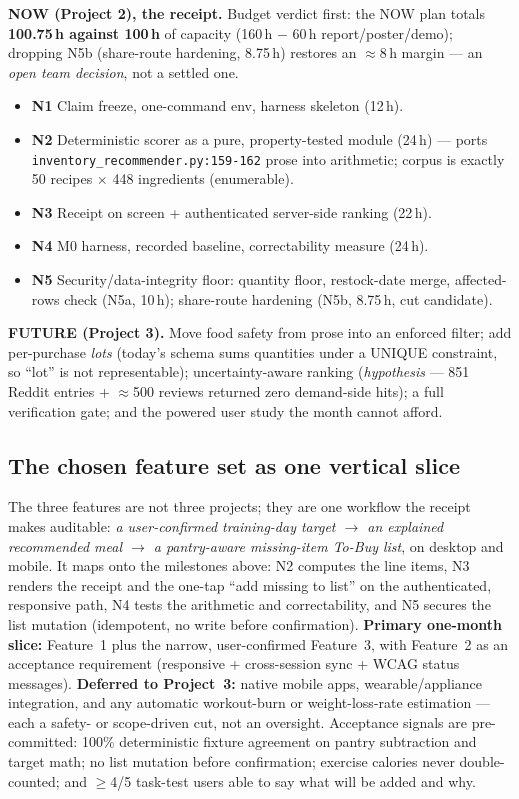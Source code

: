 \documentclass[sigconf,nonacm]{acmart}
\begin{document}
\textbf{NOW (Project 2), the receipt.} Budget verdict first: the NOW plan totals
\textbf{100.75\,h against 100\,h} of capacity (160\,h $-$ 60\,h report/poster/demo);
dropping N5b (share-route hardening, 8.75\,h) restores an $\approx$8\,h margin ---
an \emph{open team decision}, not a settled one.
\begin{itemize}[leftmargin=1.2em]
\item \textbf{N1} Claim freeze, one-command env, harness skeleton (12\,h).
\item \textbf{N2} Deterministic scorer as a pure, property-tested module (24\,h) --- ports \texttt{inventory\_recommender.py:159-162} prose into arithmetic; corpus is exactly 50 recipes $\times$ 448 ingredients (enumerable).
\item \textbf{N3} Receipt on screen + authenticated server-side ranking (22\,h).
\item \textbf{N4} M0 harness, recorded baseline, correctability measure (24\,h).
\item \textbf{N5} Security/data-integrity floor: quantity floor, restock-date merge, affected-rows check (N5a, 10\,h); share-route hardening (N5b, 8.75\,h, cut candidate).
\end{itemize}

\textbf{FUTURE (Project 3).} Move food safety from prose into an enforced filter;
add per-purchase \emph{lots} (today's schema sums quantities under a UNIQUE
constraint, so ``lot'' is not representable); uncertainty-aware ranking
(\emph{hypothesis} --- 851 Reddit entries + $\approx$500 reviews returned zero
demand-side hits); a full verification gate; and the powered user study the month
cannot afford.

\subsection{The chosen feature set as one vertical slice}
The three features are not three projects; they are one workflow the receipt makes
auditable: \emph{a user-confirmed training-day target $\rightarrow$ an explained
recommended meal $\rightarrow$ a pantry-aware missing-item To-Buy list}, on desktop
and mobile. It maps onto the milestones above: N2 computes the line items, N3
renders the receipt and the one-tap ``add missing to list'' on the authenticated,
responsive path, N4 tests the arithmetic and correctability, and N5 secures the
list mutation (idempotent, no write before confirmation). \textbf{Primary
one-month slice:} Feature~1 plus the narrow, user-confirmed Feature~3, with
Feature~2 as an acceptance requirement (responsive + cross-session sync + WCAG
status messages). \textbf{Deferred to Project~3:} native mobile apps,
wearable/appliance integration, and any automatic workout-burn or
weight-loss-rate estimation --- each a safety- or scope-driven cut, not an
oversight. Acceptance signals are pre-committed: 100\% deterministic fixture
agreement on pantry subtraction and target math; no list mutation before
confirmation; exercise calories never double-counted; and $\geq$4/5 task-test users
able to say what will be added and why.
\end{document}

